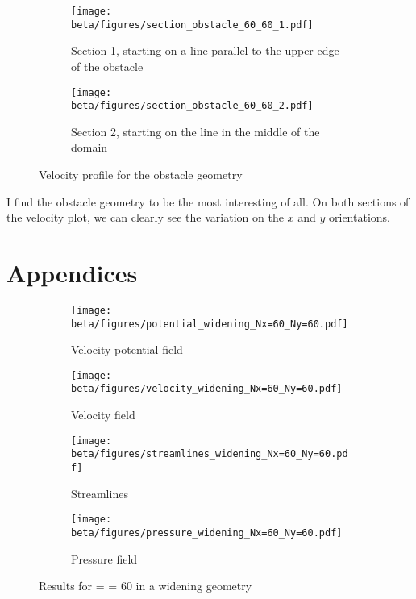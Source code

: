 \newpage
\begin{figure}[htbp]
      \centering
      \begin{subfigure}{.45\textwidth}
            \centering
            \texttt{[image: beta/figures/section\_obstacle\_60\_60\_1.pdf]}
            \caption{Section 1, starting on a line parallel to the upper edge
            of the obstacle}   
      \end{subfigure}
      \begin{subfigure}{.45\textwidth}
            \centering
            \texttt{[image: beta/figures/section\_obstacle\_60\_60\_2.pdf]}
            \caption{Section 2, starting on the line in the middle of the
            domain}   
      \end{subfigure}
      \caption{Velocity profile for the obstacle geometry}
\end{figure}

I find the obstacle geometry to be the most interesting of all. On both
sections of the velocity plot, we can clearly see the variation on the $x$ and
$y$ orientations.
\newpage
\begin{multicols}{2}
    [\center{\printbibheading}]
    \printbibliography[heading=none]
\end{multicols}
\newpage
\part{Appendices}\label{sec:appendix}
\begin{figure}[htbp]
      \centering
      \begin{subfigure}{.45\textwidth}
            \texttt{[image: beta/figures/potential\_widening\_Nx=60\_Ny=60.pdf]}
            \caption{Velocity potential field}\label{fig:vel_pot_field_wid}
      \end{subfigure}
      \begin{subfigure}{.45\textwidth}
            \texttt{[image: beta/figures/velocity\_widening\_Nx=60\_Ny=60.pdf]}
            \caption{Velocity field}\label{fig:velocity_field_wid}
      \end{subfigure}

      \centering
      \begin{subfigure}{.45\textwidth}
            \texttt{[image: beta/figures/streamlines\_widening\_Nx=60\_Ny=60.pdf]}
            \caption{Streamlines}\label{fig:streamlines_wid}
      \end{subfigure}
      \begin{subfigure}{.45\textwidth}
            \texttt{[image: beta/figures/pressure\_widening\_Nx=60\_Ny=60.pdf]}
            \caption{Pressure field}\label{fig:pressure_field_wid}
      \end{subfigure}
      \caption{Results for  =  = \num{60} in a widening geometry}
\end{figure}

